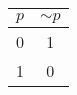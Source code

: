 \begin{tabular}{|c||c|}
\hline
$ p $ & $  \sim p $ \\
\hline
0 & 1 \\
1 & 0 \\
\hline
\end{tabular}
\label{table:tt1}
